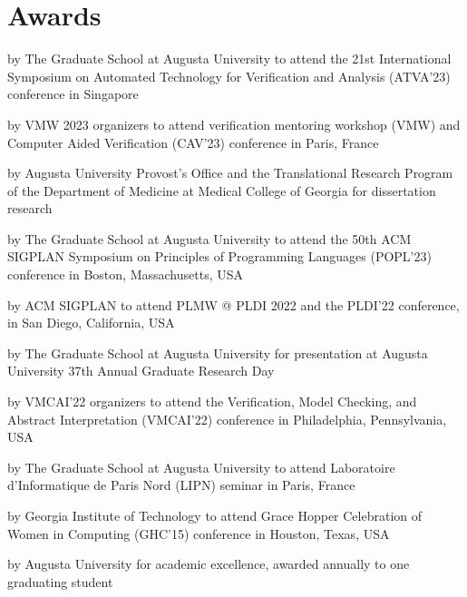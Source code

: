 \documentclass[10pt,letterpaper,roman]{moderncv}
\begin{document}
\section{Awards}

{by The Graduate School at Augusta University}
{to attend the 21st International Symposium on Automated Technology for Verification and Analysis (ATVA'23) conference in Singapore}{}{}

{by VMW 2023 organizers}
{to attend verification mentoring workshop (VMW) and Computer Aided Verification (CAV'23) conference in Paris, France}{}{}

{by Augusta University Provost's Office and the Translational Research Program of the Department of Medicine at Medical College of Georgia}
{for dissertation research}{}{}

{by The Graduate School at Augusta University}
{to attend the 50th ACM SIGPLAN Symposium on Principles of Programming Languages (POPL'23) conference in Boston, Massachusetts, USA}{}{}

{by ACM SIGPLAN}
{to attend PLMW @ PLDI 2022 and the PLDI'22 conference, in San Diego, California, USA}{}{}

{by The Graduate School at Augusta University}
{for presentation at Augusta University 37th Annual Graduate Research Day}{}{}

{by VMCAI'22 organizers}
{to attend the Verification, Model Checking, and Abstract Interpretation (VMCAI'22) conference in Philadelphia, Pennsylvania, USA}{}{}

{by The Graduate School at Augusta University}
{to attend Laboratoire d'Informatique de Paris Nord (LIPN) seminar in Paris, France}{}{}

{by Georgia Institute of Technology}
{to attend Grace Hopper Celebration of Women in Computing (GHC'15) conference in Houston, Texas, USA}{}{}

{by Augusta University}
{for academic excellence, awarded annually to one graduating student}{}{}
\end{document}
